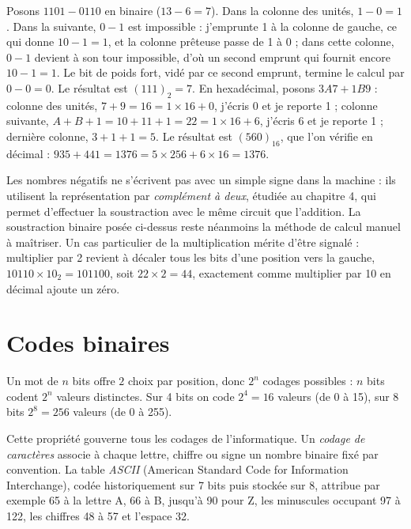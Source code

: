 \begin{exemple}
Posons $1101 - 0110$ en binaire ($13 - 6 = 7$). Dans la colonne des unités, $1 - 0 = 1$. Dans la suivante, $0 - 1$ est impossible : j'emprunte 1 à la colonne de gauche, ce qui donne $10 - 1 = 1$, et la colonne prêteuse passe de 1 à 0 ; dans cette colonne, $0 - 1$ devient à son tour impossible, d'où un second emprunt qui fournit encore $10 - 1 = 1$. Le bit de poids fort, vidé par ce second emprunt, termine le calcul par $0 - 0 = 0$. Le résultat est $(111)_2 = 7$. En hexadécimal, posons $3A7 + 1B9$ : colonne des unités, $7 + 9 = 16 = 1\times 16 + 0$, j'écris $0$ et je reporte 1 ; colonne suivante, $A + B + 1 = 10 + 11 + 1 = 22 = 1\times 16 + 6$, j'écris $6$ et je reporte 1 ; dernière colonne, $3 + 1 + 1 = 5$. Le résultat est $(560)_{16}$, que l'on vérifie en décimal : $935 + 441 = 1376 = 5\times 256 + 6\times 16 = 1376$.
\end{exemple}

\begin{remarque}
Les nombres négatifs ne s'écrivent pas avec un simple signe dans la machine : ils utilisent la représentation par \emph{complément à deux}, étudiée au chapitre 4, qui permet d'effectuer la soustraction avec le même circuit que l'addition. La soustraction binaire posée ci-dessus reste néanmoins la méthode de calcul manuel à maîtriser. Un cas particulier de la multiplication mérite d'être signalé : multiplier par 2 revient à décaler tous les bits d'une position vers la gauche, $10110 \times 10_2 = 101100$, soit $22 \times 2 = 44$, exactement comme multiplier par 10 en décimal ajoute un zéro.
\end{remarque}

\section{Codes binaires}

\begin{propriete}
Un mot de $n$ bits offre $2$ choix par position, donc $2^{n}$ codages possibles : $n$ bits codent $2^{n}$ valeurs distinctes. Sur 4 bits on code $2^{4} = 16$ valeurs (de 0 à 15), sur 8 bits $2^{8} = 256$ valeurs (de 0 à 255).
\end{propriete}

Cette propriété gouverne tous les codages de l'informatique. Un \emph{codage de caractères} associe à chaque lettre, chiffre ou signe un nombre binaire fixé par convention. La table \emph{ASCII} (American Standard Code for Information Interchange), codée historiquement sur 7 bits puis stockée sur 8, attribue par exemple 65 à la lettre A, 66 à B, jusqu'à 90 pour Z, les minuscules occupant 97 à 122, les chiffres 48 à 57 et l'espace 32.

